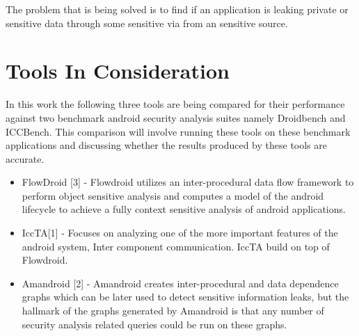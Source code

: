 \documentclass[journal]{IEEEtran}
\begin{document}
The problem that is being solved is to find if an application is leaking private or sensitive data through some sensitive via from an sensitive source.\\
 
\section{Tools In Consideration}
In this work the following three tools are being compared for their performance against two benchmark android security analysis suites namely Droidbench and ICCBench. This comparison will involve running these tools on these benchmark applications and discussing whether the results produced by these tools are accurate.

\begin{itemize}
	\item FlowDroid [3] - Flowdroid utilizes an inter-procedural data flow framework to perform object sensitive analysis and computes a model of the android lifecycle to achieve a fully context sensitive analysis of android applications.
	\item IccTA[1] - Focuses on analyzing one of the more important features of the android system, Inter component communication. IccTA build on top of Flowdroid.
	\item Amandroid [2] - Amandroid creates inter-procedural and data dependence graphs which can be later used to detect sensitive information leaks, but the hallmark of the graphs generated by Amandroid is that any number of security analysis related queries could be run on these graphs. 
\end{itemize}
\end{document}
